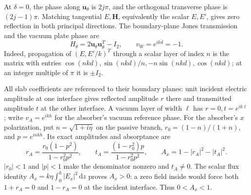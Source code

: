 \documentclass[11pt]{article}
\newcommand{\dd}{\,\mathrm{d}}
\newcommand{\uvec}{\mathbf u_\theta}
\newcommand{\abs}[1]{\lvert #1\rvert}
\begin{document}
At $\delta=0$, the phase along $\uvec$ is $2j\pi$, and the orthogonal transverse phase is $(2j-1)\pi$. Matching tangential $E,\mathbf H$, equivalently the scalar $E,E'$, gives zero reflection in both principal directions. The boundary-plane Jones transmission and the vacuum plate phase are
\begin{equation}\label{eq:jones}
 H_\theta=2\uvec\uvec^T-I_2,\qquad v_W=e^{ikd}=-1.
\end{equation}
Indeed, propagation of $(E,E'/k)^T$ through a scalar layer of index $n$ is the matrix with entries $\cos(nkd),\sin(nkd)/n,-n\sin(nkd),\cos(nkd)$; at an integer multiple of $\pi$ it is $\pm I_2$.

All slab coefficients are referenced to their boundary planes: unit incident electric amplitude at one interface gives reflected amplitude $r$ there and transmitted amplitude $t$ at the other interface. A vacuum layer of width $\ell$ has $r=0,t=e^{ik\ell}$; write $v_A=e^{ikh}$ for the absorber's vacuum reference phase. For the absorber's $x$ polarization, put $n=\sqrt{1+i\eta}$ on the passive branch, $r_0=(1-n)/(1+n)$, and $p=e^{inkh}$. Its exact amplitudes and absorptance are
\begin{equation}\label{eq:absorber}
 r_A=\frac{r_0(1-p^2)}{1-r_0^2p^2},\qquad
 t_A=\frac{(1-r_0^2)p}{1-r_0^2p^2},\qquad
 A_x=1-\abs{r_A}^2-\abs{t_A}^2.
\end{equation}
$\abs{r_0}<1$ and $\abs p<1$ make the denominator nonzero and $t_A\ne0$. The scalar flux identity $A_x=k\eta\int_0^h\abs{E_x}^2\dd z$ proves $A_x>0$: a zero field inside would force both $1+r_A=0$ and $1-r_A=0$ at the incident interface. Thus $0<A_x<1$.
\end{document}
